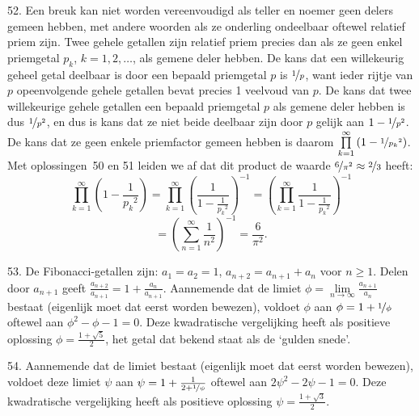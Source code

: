 \begin{problem}{52.}
    Een breuk kan niet worden vereenvoudigd als teller en noemer geen delers gemeen hebben, met andere woorden als ze onderling ondeelbaar oftewel relatief priem zijn. Twee gehele getallen zijn relatief priem precies dan als ze geen enkel priemgetal $p_k$, $k = 1,2,\dotsc$, als gemene deler hebben. De kans dat een willekeurig geheel getal deelbaar is door een bepaald priemgetal $p$ is $\nicefrac{1}{p}$, want ieder rijtje van $p$ opeen\-volgende gehele getallen bevat precies 1 veelvoud van $p$. De kans dat twee willekeurige gehele getallen een bepaald priemgetal $p$ als gemene deler hebben is dus $\nicefrac{1}{p^2}$, en dus is kans dat ze niet beide deelbaar zijn door $p$ gelijk aan $1 - \nicefrac{1}{p^2}$. De kans dat ze geen enkele priemfactor gemeen hebben is daarom $\prod\limits_{k=1}^{\infty} \left( 1 - \nicefrac{1}{{p_k}^2} \right)$. Met oplossingen~50 en 51 leiden we af dat dit product de waarde $\nicefrac{6}{\pi^2} \approx \nicefrac{2}{3}$ heeft:
    \begin{equation*}
        \textstyle\prod\limits_{k=1}^{\infty} \left( 1 - \frac{1}{{p_k}^2} \right) = \textstyle\prod\limits_{k=1}^{\infty} {\left( \frac{1}{1 - \frac{1}{{p_k}^2}} \right)}^{-1} = {\left( \textstyle\prod\limits_{k=1}^{\infty} \frac{1}{1 - \frac{1}{{p_k}^2}} \right)}^{-1}
    \end{equation*}
    \begin{equation*}
        = {\left( \textstyle\sum\limits_{n=1}^{\infty} \frac{1}{n^2} \right)}^{-1} = \frac{6}{\pi^2}.
    \end{equation*}
\end{problem}

\begin{problem}{53.}
	De Fibonacci-getallen zijn: $a_1 = a_2 = 1$, $a_{n+2} = a_{n+1} + a_n$ voor $n \geq 1$. Delen door $a_{n+1}$ geeft $\frac{a_{n+2}}{a_{n+1}} = 1 + \frac{a_n}{a_{n+1}}$. Aannemende dat de limiet $\phi = \lim\limits_{n \to \infty} \frac{a_{n+1}}{a_n}$ bestaat (eigenlijk moet dat eerst worden bewezen), voldoet $\phi$ aan $\phi = 1 + \nicefrac{1}{\phi}$ oftewel aan $\phi^2 - \phi - 1 = 0$. Deze kwadratische vergelijking heeft als positieve oplossing $\phi = \frac{1 + \sqrt{5}}{2}$, het getal dat bekend staat als de `gulden snede'.
\end{problem}

\begin{problem}{54.}
	Aannemende dat de limiet bestaat (eigenlijk moet dat eerst worden bewezen), voldoet deze limiet $\psi$ aan $\psi = 1 + \frac{1}{2 + \nicefrac{1}{\psi}}$ oftewel aan $2 \psi^2 - 2 \psi - 1 = 0$. Deze kwadratische vergelijking heeft als positieve oplossing $\psi = \frac{1 + \sqrt{3}}{2}$.
\end{problem}

